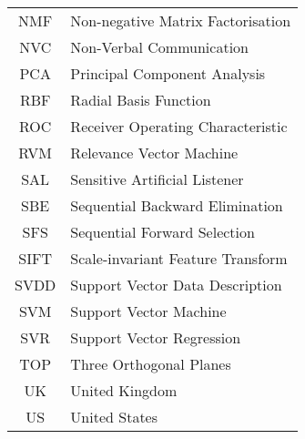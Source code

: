 \documentclass[11pt]{book}  %
\begin{document}
\begin{center}
\begin{tabular*}{0.65\textwidth}{  c | l  }
%
{NMF}&Non-negative Matrix Factorisation\\
{NVC}&Non-Verbal Communication\\
{PCA}&Principal Component Analysis\\
{RBF}&Radial Basis Function\\
{ROC}&Receiver Operating Characteristic\\
{RVM}&Relevance Vector Machine\\
{SAL}&Sensitive Artificial Listener\\
{SBE}&Sequential Backward Elimination\\
{SFS}&Sequential Forward Selection\\
{SIFT}&Scale-invariant Feature Transform\\
{SVDD}&Support Vector Data Description\\
{SVM}&Support Vector Machine\\
{SVR}&Support Vector Regression\\
{TOP}&Three Orthogonal Planes\\
{UK}&United Kingdom\\
{US}&United States\\

\end{tabular*}
\end{center}

\mainmatter

\renewcommand{\baselinestretch}{1.5}\small\normalsize   



\newcommand{\thesisstatement}[1]{}
\newcommand{\thesiscomment}[1]{}



%










\backmatter
{} 

{
\scriptsize

\normalsize
}
\end{document}
